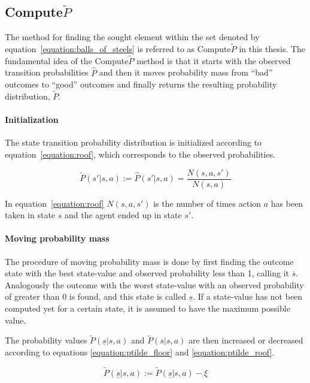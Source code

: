 \subsection{Compute$\tilde{P}$}
\label{sec:ptilde}

The method for finding the sought element within the set denoted by
equation~\eqref{equation:balls_of_steels} is referred to as Compute$\tilde{P}$ in this
thesis.  The fundamental idea of the Compute$\tilde{P}$ method is that it
starts with the observed transition probabilities $\hat{P}$ and then it moves
probability mass from ``bad'' outcomes to ``good'' outcomes and finally returns
the resulting probability distribution, $\tilde{P}$. 


\paragraph{Initialization} The state transition probability distribution is
initialized according to equation~\eqref{equation:roof}, which corresponds to
the observed probabilities.

\begin{equation}
\label{equation:roof}
\tilde{P}(s'|s, a) := \hat{P}(s'|s, a) = \frac{N(s,a,s')}{N(s,a)}
\end{equation}

In equation~\eqref{equation:roof} $N(s, a, s')$ is the number of times action
$a$ has been taken in state $s$ and the agent ended up in state $s'$.

\paragraph{Moving probability mass}

The procedure of moving probability mass is done by first finding the outcome
state with the best state-value and observed probability less than 1, calling it
$\overline{s}$. Analogously the outcome with the worst state-value with an
observed probability of greater than 0 is found, and this state is called
$\underline{s}$. If a state-value has not been computed yet for a certain state,
it is assumed to have the maximum possible value. 

The probability values $\tilde{P}(\underline{s}|s,a)$ and
$\tilde{P}(\overline{s}|s,a)$ are then increased or decreased according to
equations \eqref{equation:ptilde_floor} and \eqref{equation:ptilde_roof}.

\begin{equation}
\label{equation:ptilde_floor}
\tilde{P}(\underline{s}|s,a) := \tilde{P}(\underline{s}|s,a)-\xi
\end{equation}

